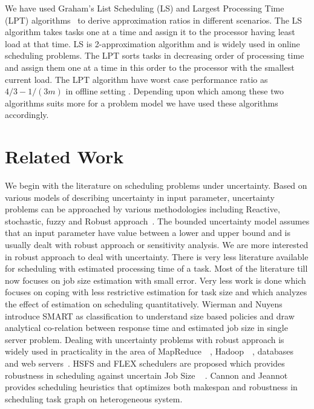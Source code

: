 \documentclass[10pt, conference, compsocconf]{IEEEtran}
\begin{document}
We have used  Graham's List Scheduling (LS) and Largest Processing Time (LPT) algorithms~\cite{Graham69boundson} to derive approximation ratios in different scenarios. The LS algorithm takes tasks one at a time and assign  it to the processor having least load at that time. LS is 2-approximation algorithm and is widely used in online scheduling problems.  The LPT sorts tasks in decreasing order of processing time and assign them one at a time in this order to the processor with the smallest current load. The LPT algorithm have worst case performance ratio as $4/3-1/(3m) $ in offline setting
. Depending upon which among these two algorithms suits more for a problem model we have used these algorithms accordingly.

\section{Related Work}
We begin with the literature on scheduling problems under uncertainty. Based on various models of describing uncertainty in input parameter, uncertainty problems can be approached by various methodologies including Reactive, stochastic, fuzzy and Robust approach~\cite{DBLP:journals/cce/LiI08}. The bounded uncertainty model assumes that an input parameter have value between a lower and upper bound and is usually dealt with robust approach or sensitivity analysis. We are more interested in robust approach to deal with uncertainty. There is very less literature available for scheduling with estimated processing time of a task. Most of the literature till now focuses on job size estimation with small error. Very less work is done which focuses on coping with less restrictive estimation for task size and which analyzes the effect of estimation on scheduling quantitatively. Wierman and Nuyens~\cite{conf/sigmetrics/WiermanN08} introduce  SMART as classification to understand size based policies and draw analytical co-relation between response time and estimated job size in single server problem. Dealing with uncertainty problems with robust approach
is widely used in practicality in the area of MapReduce~\cite{Kavulya:2010:ATP:1844765.1845224}~\cite{Verma:2011:AAR:1998582.1998637}, Hadoop~\cite{Wolf:2010:FSA:2023718.2023720}~\cite{White:2009:HDG:1717298}, databases~\cite{Lipton199518} and web servers~\cite{Cardellini99dynamicload}. HSFS and FLEX  schedulers are proposed which provides robustness in scheduling against uncertain Job Size ~\cite{Wolf:2010:FSA:2023718.2023720}  \cite{6691554}. Cannon and Jeannot ~\cite{cj09c} provides scheduling heuristics that optimizes both makespan and robustness in scheduling task graph on heterogeneous system.
\end{document}
